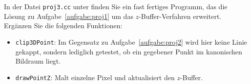 \label{aufgabe:proj3}
%
In der Datei \texttt{proj3.cc} unter 
 finden Sie ein fast 
fertiges Programm, das die Lösung zu Aufgabe~\ref{aufgabe:proj1} um das 
$z$-Buffer-Verfahren erweitert. Ergänzen Sie die folgenden Funktionen:
\begin{itemize}
\item \texttt{clip3DPoint}: Im Gegensatz zu Aufgabe~\ref{aufgabe:proj2} 
      wird hier keine Linie gekappt, sondern lediglich getestet, ob ein 
      gegebener Punkt im kanonischen Bildraum liegt.
\item \texttt{drawPointZ}: Malt einzelne Pixel und aktualisiert den
      $z$-Buffer.
\end{itemize}
